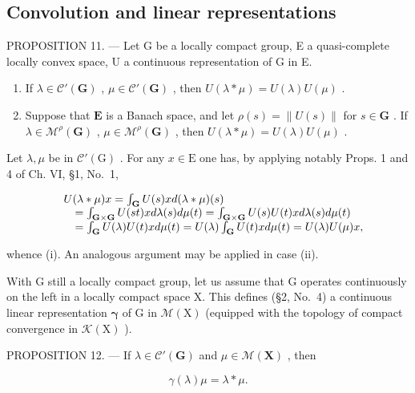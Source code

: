\subsection{Convolution and linear representations}

PROPOSITION 11. --- Let G be a locally compact group, E a quasi-complete locally convex space, U a continuous representation of G in E.

\begin{enumerate}
\def\labelenumi{(\roman{enumi})}
\item
  If \(\lambda \in \mathcal{C}'(\mathbf{G})\) , \(\mu \in \mathcal{C}'(\mathbf{G})\) , then \(U(\lambda * \mu) = U(\lambda)U(\mu)\) .
\item
  Suppose that \(\mathbf{E}\) is a Banach space, and let \(\rho(s) = \|U(s)\|\) for \(s\in\mathbf{G}\) . If \(\lambda\in\mathcal{M}^{\rho}(\mathbf{G})\) , \(\mu\in\mathcal{M}^{\rho}(\mathbf{G})\) , then \(U(\lambda*\mu)=U(\lambda)U(\mu)\) .
\end{enumerate}

Let \(\lambda, \mu\) be in \(\mathcal{C}'(\mathrm{G})\) . For any \(x \in \mathrm{E}\) one has, by applying notably Props. 1 and 4 of Ch. VI, §1, No.~1,

\[
\begin{array}{r l} & U (\lambda * \mu) x = \int_ {\mathbf {G}} U (s) x d (\lambda * \mu) (s) \\ & \quad = \int_ {\mathbf {G} \times \mathbf {G}} U (s t) x d \lambda (s) d \mu (t) = \int_ {\mathbf {G} \times \mathbf {G}} U (s) U (t) x d \lambda (s) d \mu (t) \\ & \quad = \int_ {\mathbf {G}} U (\lambda) U (t) x d \mu (t) = U (\lambda) \int_ {\mathbf {G}} U (t) x d \mu (t) = U (\lambda) U (\mu) x, \end{array}
\]

whence (i). An analogous argument may be applied in case (ii).

With G still a locally compact group, let us assume that G operates continuously on the left in a locally compact space X. This defines (§2, No.~4) a continuous linear representation \(\pmb{\gamma}\) of G in \(\mathcal{M}(\mathrm{X})\) (equipped with the topology of compact convergence in \(\mathcal{K}(\mathrm{X})\) ).

PROPOSITION 12. --- If \(\lambda \in \mathcal{C}'(\mathbf{G})\) and \(\mu \in \mathcal{M}(\mathbf{X})\) , then

\[
\gamma (\lambda) \mu = \lambda * \mu .
\]

